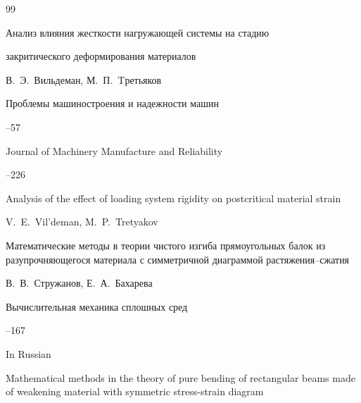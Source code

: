 \begin{thebibliography}{99}










\paper Анализ влияния жесткости нагружающей системы на стадию 

закритического деформирования материалов 

\by В.~Э.~Вильдеман, М.~П.~Tретьяков

\jour Проблемы машиностроения и надежности машин



--57


\transl

\jour Journal of Machinery Manufacture and Reliability




--226

\paper Analysis of the effect of loading system rigidity on postcritical material strain

\by V.~E.~Vil'deman, M.~P.~Tretyakov 





\paper Математические методы в теории чистого изгиба прямоугольных балок из разупрочняющегося материала с симметричной диаграммой растяжения--сжатия

\by В.~В.~Стружанов, Е.~А.~Бахарева

\jour Вычислительная механика сплошных сред




--167


\misctransl

\lang In Russian

\paper Mathematical methods in the theory of pure bending of rectangular beams made of weakening material with symmetric stress-strain diagram


\end{thebibliography}
